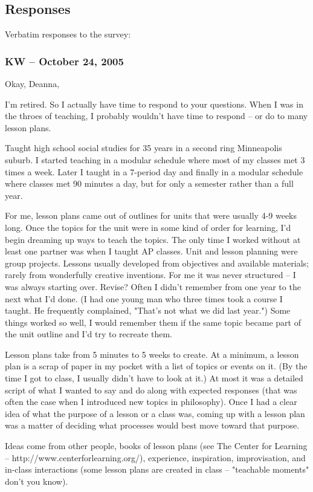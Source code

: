 \documentclass[10pt,letter,titlepage]{article}
\begin{document}
\subsection{Responses}
Verbatim responses to the survey:

\subsubsection{KW -- October 24, 2005}
Okay, Deanna,

I'm retired. So I actually have time to respond to your questions. When I was in
the throes of teaching, I probably wouldn't have time to respond -- or do to
many lesson plans.

Taught high school social studies for 35 years in a second ring Minneapolis
suburb. I started teaching in a modular schedule where most of my classes met 3
times a week. Later I taught in a 7-period day and finally in a modular schedule
where classes met 90 minutes a day, but for only a semester rather than a full
year.

For me, lesson plans came out of outlines for units that were usually 4-9 weeks
long. Once the topics for the unit were in some kind of order for learning, I'd
begin dreaming up ways to teach the topics.  The only time I worked without at
least one partner was when I taught AP classes. Unit and lesson planning were
group projects.  Lessons usually developed from objectives and available
materials; rarely from wonderfully creative inventions. For me it was never
structured -- I was always starting over. Revise? Often I didn't remember from
one year to the next what I'd done. (I had one young man who three times took a
course I taught. He frequently complained, "That's not what we did last year.")
Some things worked so well, I would remember them if the same topic became part
of the unit outline and I'd try to recreate them.

Lesson plans take from 5 minutes to 5 weeks to create. At a minimum, a lesson
plan is a scrap of paper in my pocket with a list of topics or events on it. (By
the time I got to class, I usually didn't have to look at it.) At most it was a
detailed script of what I wanted to say and do along with expected responses
(that was often the case when I introduced new topics in philosophy). Once I had
a clear idea of what the purpose of a lesson or a class was, coming up with a
lesson plan was a matter of deciding what processes would best move toward that
purpose.

Ideas come from other people, books of lesson plans (see The Center for Learning
-- http://www.centerforlearning.org/), experience, inspiration, improvisation,
and in-class interactions (some lesson plans are created in class -- "teachable
moments" don't you know).
\end{document}
